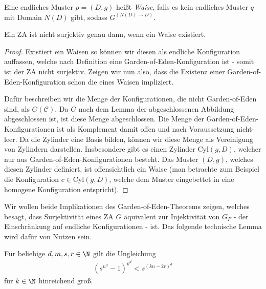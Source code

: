 \begin{definition}
  Eine endliches Muster $p = (D,g)$ heißt \textit{Waise}, falls es kein endliches Muster $q$ mit Domain $N(D)$ gibt, sodass $G^{(N(D) \to D)}$.
\end{definition}

\begin{proposition}
  Ein ZA ist nicht surjektiv genau dann, wenn ein Waise existiert.
\end{proposition}

\begin{proof}
  Existiert ein Waisen so können wir diesen als endliche Konfiguration auffassen, welche nach Definition eine Garden-of-Eden-Konfiguration ist - somit ist der ZA nicht surjektiv. Zeigen wir nun also, dass die Existenz einer Garden-of-Eden-Konfiguration schon die eines Waisen impliziert.

  Dafür beschreiben wir die Menge der Konfigurationen, die nicht Garden-of-Eden sind, als $G(\mathcal{C})$. Da $G$ nach dem Lemma der abgeschlossenen Abbildung abgeschlossen ist, ist diese Menge abgeschlossen. Die Menge der Garden-of-Eden-Konfigurationen ist als Komplement damit offen und nach Voraussetzung nicht-leer. Da die Zylinder eine Basis bilden, können wir diese Menge als Vereinigung von Zylindern darstellen. Insbesondere gibt es einen Zylinder Cyl$(g,D)$, welcher nur aus Garden-of-Eden-Konfigurationen besteht. Das Muster $(D,g)$, welches diesen Zylinder definiert, ist offensichtlich ein Waise (man betrachte zum Beispiel die Konfiguration $c \in \text{Cyl}(g,D)$, welche dem Muster eingebettet in eine homogene Konfiguration entspricht).
\end{proof}

Wir wollen beide Implikationen des Garden-of-Eden-Theorems zeigen, welches besagt, dass Surjektivität eines ZA $G$ äquivalent zur Injektivität von $G_F$ - der Einschränkung auf endliche Konfigurationen - ist. Das folgende technische Lemma wird dafür von Nutzen sein.

\begin{lemma}
  Für beliebige $d, m, s, r \in  \N$ gilt die Ungleichung
  \begin{align*}
    (s^{n^d}-1)^{k^d} < s ^{(kn-2r)^d}
  \end{align*}
  für $k \in \N$ hinreichend groß.
\end{lemma}

